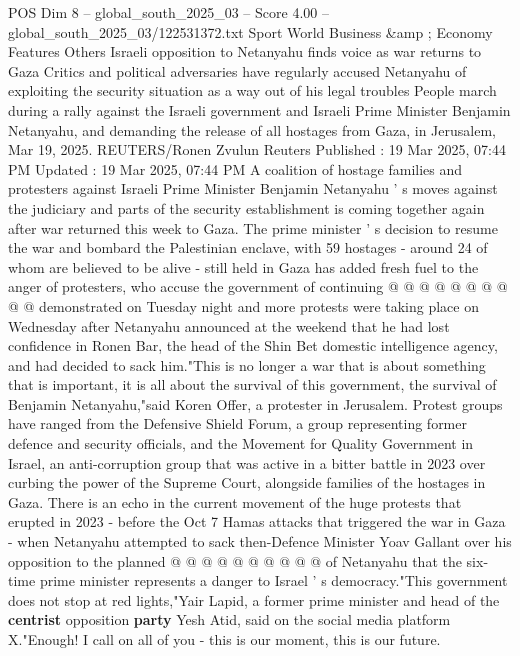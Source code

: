\begin{textsample}{POS Dim 8 – global\_south\_2025\_03 – Score 4.00 – global\_south\_2025\_03/122531372.txt}  \label{ex:f8_pos_381}
Sport World Business \&amp ; Economy Features Others Israeli opposition to Netanyahu finds voice as war returns to Gaza Critics and political adversaries have regularly accused Netanyahu of exploiting the security situation as a way out of his legal troubles People march during a rally against the Israeli government and Israeli Prime Minister Benjamin Netanyahu, and demanding the release of all hostages from Gaza, in Jerusalem, Mar 19, 2025.
REUTERS/Ronen Zvulun Reuters Published : 19 Mar 2025, 07:44 PM Updated : 19 Mar 2025, 07:44 PM A coalition of hostage families and protesters against Israeli Prime Minister Benjamin Netanyahu ' s moves against the judiciary and parts of the security establishment is coming together again after war returned this week to Gaza.
The prime minister ' s decision to resume the war and bombard the Palestinian enclave, with 59 hostages - around 24 of whom are believed to be alive - still held in Gaza has added fresh fuel to the anger of protesters, who accuse the government of continuing @ @ @ @ @ @ @ @ @ @ demonstrated on Tuesday night and more protests were taking place on Wednesday after Netanyahu announced at the weekend that he had lost confidence in Ronen Bar, the head of the Shin Bet domestic intelligence agency, and had decided to sack him."This is no longer a war that is about something that is important, it is all about the survival of this government, the survival of Benjamin Netanyahu,"said Koren Offer, a protester in Jerusalem.
Protest groups have ranged from the Defensive Shield Forum, a group representing former defence and security officials, and the Movement for Quality Government in Israel, an anti-corruption group that was active in a bitter battle in 2023 over curbing the power of the Supreme Court, alongside families of the hostages in Gaza.
There is an echo in the current movement of the huge protests that erupted in 2023 - before the Oct 7 Hamas attacks that triggered the war in Gaza - when Netanyahu attempted to sack then-Defence Minister Yoav Gallant over his opposition to the planned @ @ @ @ @ @ @ @ @ @ of Netanyahu that the six-time prime minister represents a danger to Israel ' s democracy."This government does not stop at red lights,"Yair Lapid, a former prime minister and head of the \textbf{centrist} opposition \textbf{party} Yesh Atid, said on the social media platform X."Enough!
I call on all of you - this is our moment, this is our future.

\end{textsample}
